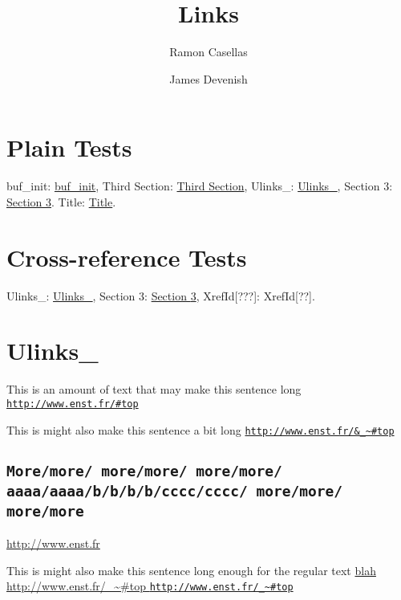 \documentclass[pdftex,a4paper,10pt]{article}
\title{\textbf{Links}}
\author{Ramon Casellas \and James Devenish}
\makeatletter
\newcommand{\dbz}{\penalty \z@}
\makeatother
\begin{document}
{\maketitle\pagestyle{empty}\thispagestyle{empty}}

\section{Plain Tests}
\label{id184750}\hypertarget{id184750}{}%

buf\_init: \hyperlink{buf-init}{buf\_init},
Third Section:
\hyperlink{sec:ulinks}{Third Section},
Ulinks\_:
\hyperlink{sec:ulinks}{Ulinks\_},
Section 3:
\hyperlink{sec:ulinks}{Section {\ref{sec:ulinks}}}.
Title:
\hyperlink{title:ulinks}{Title}.
\section{Cross-reference Tests}
\label{id184790}\hypertarget{id184790}{}%

Ulinks\_:
\hyperlink{sec:ulinks}{Ulinks\_},
Section 3:
\hyperlink{sec:ulinks}{Section {\ref{sec:ulinks}}},
XrefId[???]:
XrefId[??].
\section{Ulinks\_}
\label{sec:ulinks}\hypertarget{sec:ulinks}{}%
\hypertarget{buf-init}{}
This is an amount of text that may make this sentence long \href{http://www.enst.fr/#top}{\texttt{http:/\dbz{}/\dbz{}www.\dbz{}enst.\dbz{}fr/\dbz{}\#top}}

This is might also make this sentence a bit long \href{http://www.enst.fr/\&_~#top}{\texttt{http:/\dbz{}/\dbz{}www.\dbz{}enst.\dbz{}fr/\dbz{}\&\_\textasciitilde{}\#top}}
\subsection{{\texttt{{More/\dbz{}more/\dbz{} more/\dbz{}more/\dbz{} more/\dbz{}more/\dbz{} aaaa/\dbz{}aaaa/\dbz{}b/\dbz{}b/\dbz{}b/\dbz{}b/\dbz{}cccc/\dbz{}cccc/\dbz{} more/\dbz{}more/\dbz{} more/\dbz{}more}}}}
\label{id185411}\hypertarget{id185411}{}%

\href{http://www.enst.fr/\&x}{http://www.enst.fr}

This is might also make this sentence long enough for the regular text \href{http://www.enst.fr/#top}{blah http://www.enst.fr/\_\textasciitilde{}\#top {\texttt{{http:/\dbz{}/\dbz{}www.\dbz{}enst.\dbz{}fr/\dbz{}\_\dbz{}\textasciitilde{}\#top}}}}
\end{document}
